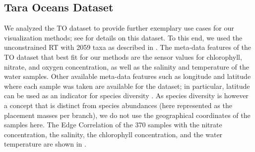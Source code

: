 
\subsection{Tara Oceans Dataset}
\label{ch:Visualization:sec:Results:sub:TaraDataset}

We analyzed the \acf{TO} dataset \cite{Karsenti2011,Sunagawa2015,Guidi2016}
to provide further exemplary use cases for our visualization methods;
see  for details on this dataset.
To this end, we used the unconstrained  \ac{RT} with \num{2059} taxa
as described in .
The meta-data features of the \ac{TO} dataset that best fit for our methods are the sensor values for
chlorophyll, nitrate, and oxygen concentration, as well as the salinity and temperature of the water samples.
Other available meta-data features such as longitude and latitude where each sample was taken are available for the dataset;
in particular, latitude can be used as an indicator for species diversity \cite{Sunagawa2015}.
As species diversity is however a concept that is distinct from species abundances
(here represented as the placement masses per branch),
we do not use the geographical coordinates of the samples here.
The Edge Correlation of the \num{370} samples with the nitrate concentration, the salinity, the chlorophyll concentration,
and the water temperature are shown in .


